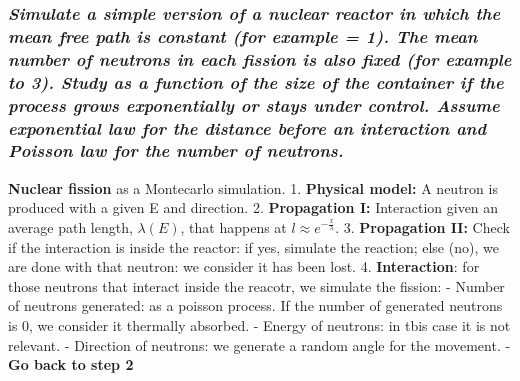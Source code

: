 \documentclass[11pt]{article}
\begin{document}
\hypertarget{simulate-a-simple-version-of-a-nuclear-reactor-in-which-the-mean-free-path-is-constant-for-example-1.-the-mean-number-of-neutrons-in-each-fission-is-also-fixed-for-example-to-3.-study-as-a-function-of-the-size-of-the-container-if-the-process-grows-exponentially-or-stays-under-control.-assume-exponential-law-for-the-distance-before-an-interaction-and-poisson-law-for-the-number-of-neutrons.}{%
\subsubsection{\texorpdfstring{\emph{Simulate a simple version of a
nuclear reactor in which the mean free path is constant (for example =
1). The mean number of neutrons in each fission is also fixed (for
example to 3). Study as a function of the size of the container if the
process grows exponentially or stays under control. Assume exponential
law for the distance before an interaction and Poisson law for the
number of
neutrons.}}{Simulate a simple version of a nuclear reactor in which the mean free path is constant (for example = 1). The mean number of neutrons in each fission is also fixed (for example to 3). Study as a function of the size of the container if the process grows exponentially or stays under control. Assume exponential law for the distance before an interaction and Poisson law for the number of neutrons.}}\label{simulate-a-simple-version-of-a-nuclear-reactor-in-which-the-mean-free-path-is-constant-for-example-1.-the-mean-number-of-neutrons-in-each-fission-is-also-fixed-for-example-to-3.-study-as-a-function-of-the-size-of-the-container-if-the-process-grows-exponentially-or-stays-under-control.-assume-exponential-law-for-the-distance-before-an-interaction-and-poisson-law-for-the-number-of-neutrons.}}

\textbf{Nuclear fission} as a Montecarlo simulation. 1. \textbf{Physical
model:} A neutron is produced with a given E and direction. 2.
\textbf{Propagation I:} Interaction given an average path length,
\(\lambda(E)\), that happens at \(l\approx e^{-\frac{x}{\lambda}}\). 3.
\textbf{Propagation II:} Check if the interaction is inside the reactor:
if yes, simulate the reaction; else (no), we are done with that neutron:
we consider it has been lost. 4. \textbf{Interaction}: for those
neutrons that interact inside the reacotr, we simulate the fission: -
Number of neutrons generated: as a poisson process. If the number of
generated neutrons is 0, we consider it thermally absorbed. - Energy of
neutrons: in tbis case it is not relevant. - Direction of neutrons: we
generate a random angle for the movement. - \textbf{Go back to step 2}
\end{document}
